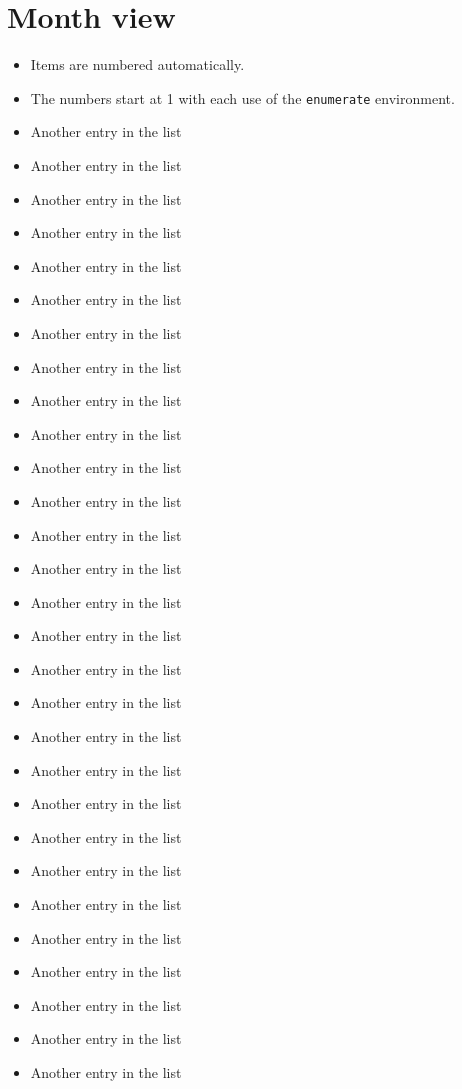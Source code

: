 \documentclass[a5paper]{article}
\begin{document}
\section{Month view}
\begin{itemize}
	\item Items are numbered automatically.
	\item The numbers start at 1 with each use of the \texttt{enumerate} environment.
	\item Another entry in the list
	\item Another entry in the list
	\item Another entry in the list
	\item Another entry in the list
	\item Another entry in the list
	\item Another entry in the list
	\item Another entry in the list
	\item Another entry in the list
	\item Another entry in the list
	\item Another entry in the list
	\item Another entry in the list
	\item Another entry in the list
	\item Another entry in the list
	\item Another entry in the list
	\item Another entry in the list
	\item Another entry in the list
	\item Another entry in the list
	\item Another entry in the list
	\item Another entry in the list
	\item Another entry in the list
	\item Another entry in the list
	\item Another entry in the list
	\item Another entry in the list
	\item Another entry in the list
	\item Another entry in the list
	\item Another entry in the list
	\item Another entry in the list
	\item Another entry in the list
	\item Another entry in the list
\end{itemize}	
\newpage
\end{document}
